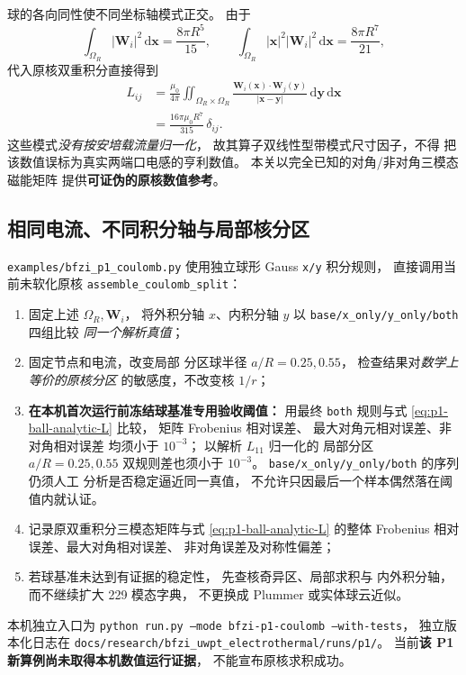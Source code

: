 球的各向同性使不同坐标轴模式正交。
由于
\[
\int_{\Omega_R}|\bm W_i|^2\,\mathrm d\bm x
=\frac{8\pi R^5}{15},\qquad
\int_{\Omega_R}|\bm x|^2|\bm W_i|^2
\,\mathrm d\bm x=\frac{8\pi R^7}{21},
\]
代入原核双重积分直接得到
\begin{align}
L_{ij}
&=\frac{\mu_0}{4\pi}
\iint_{\Omega_R\times\Omega_R}
\frac{\bm W_i(\bm x)\cdot\bm W_j(\bm y)}
{|\bm x-\bm y|}
\,\mathrm d\bm y\,\mathrm d\bm x\\
&=\boxed{\frac{16\pi\mu_0 R^7}{315}\,\delta_{ij}}.
\label{eq:p1-ball-analytic-L}
\end{align}
这些模式\emph{没有按安培载流量归一化}，
故其算子双线性型带模式尺寸因子，不得
把该数值误标为真实两端口电感的亨利数值。
本关以完全已知的对角/非对角三模态磁能矩阵
提供\textbf{可证伪的原核数值参考}。

\subsection{相同电流、不同积分轴与局部核分区}
\texttt{examples/bfzi\_p1\_coulomb.py}
使用独立球形 Gauss \texttt{x/y} 积分规则，
直接调用当前未软化原核
\texttt{assemble\_coulomb\_split}：
\begin{enumerate}
\item 固定上述 $\Omega_R,\bm W_i$，
将外积分轴 $x$、内积分轴 $y$ 以
\texttt{base/x\_only/y\_only/both} 四组比较
\emph{同一个解析真值}；
\item 固定节点和电流，改变局部
分区球半径 $a/R=0.25,0.55$，
检查结果对\emph{数学上等价的原核分区}
的敏感度，不改变核 $1/r$；
\item \textbf{在本机首次运行前冻结球基准专用验收阈值：}
用最终 \texttt{both} 规则与式
\eqref{eq:p1-ball-analytic-L} 比较，
矩阵 Frobenius 相对误差、
最大对角元相对误差、非对角相对误差
均须小于 $10^{-3}$；
以解析 $L_{11}$ 归一化的
局部分区 $a/R=0.25,0.55$
双规则差也须小于 $10^{-3}$。
\texttt{base/x\_only/y\_only/both} 的序列仍须人工
分析是否稳定逼近同一真值，
不允许只因最后一个样本偶然落在阈值内就认证。
\item 记录原双重积分三模态矩阵与式
\eqref{eq:p1-ball-analytic-L} 的整体
Frobenius 相对误差、最大对角相对误差、
非对角误差及对称性偏差；
\item 若球基准未达到有证据的稳定性，
先查核奇异区、局部求积与
内外积分轴，而不继续扩大 229 模态字典，
不更换成 Plummer 或实体球云近似。
\end{enumerate}
本机独立入口为
\texttt{python run.py --mode bfzi-p1-coulomb --with-tests}，
独立版本化日志在
\texttt{docs/research/bfzi\_uwpt\_electrothermal/runs/p1/}。
当前\textbf{该 P1 新算例尚未取得本机数值运行证据}，
不能宣布原核求积成功。


